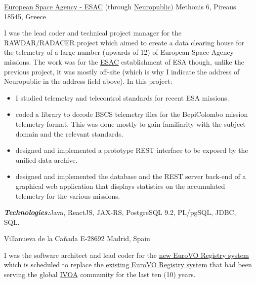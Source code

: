 \documentclass[helvetica,english,logo,notitle,totpages,utf8]{europecv2013}
\newcommand{\technologies}[0]{\textbf{\textit{Technologies:}}}
\begin{document}
\begin{europecv}
                   {\href{http://www.esac.com}{European Space Agency - ESAC} (through \href{http://www.neuropublic.gr}{Neuropublic})}
                   {Methonis 6, Pireaus 18545, Greece}
                   {
                     I was the lead coder and technical project manager for the RAWDAR/RADACER project which aimed
    to create a data clearing house for the telemetry of a large number (upwards of 12) of European Space Agency
    missions. The work was for the {\href{http://www.esac.com}{ESAC}} establishment of ESA though, unlike the previous project, it was
    mostly off-site (which is why I indicate the address of Neuropublic in the address field above). In this project:
  \begin{itemize}
    \item I studied telemetry and telecontrol standards for recent ESA missions.
    \item coded a library to decode BSCS telemetry files for the BepiColombo mission telemetry format. This was done mostly to gain
      familiarity with the subject domain and the relevant standards.
    \item designed and implemented a prototype REST interface to be exposed by the unified data archive.
    \item designed and implemented the database and the REST server back-end of a graphical web application that displays statistics
      on the accumulated telemetry for the various missions.
  \end{itemize}
  \technologies Java, ReactJS, JAX-RS, PostgreSQL 9.2, PL/pgSQL, JDBC, SQL.
                   }
                   
                                     {Villanueva de la Cañada
                                     E-28692 Madrid, Spain}
                                     {
I was the software architect and lead coder for the
    \href{registry.euro-vo.org}{new EuroVO Registry system}
    which is scheduled to replace the \href{registry.euro-vo.org}{existing EuroVO Registry system} that had been
    serving the global \href{http://www.ivoa.net/}{IVOA} community for the last ten (10) years.

}
\end{europecv}
\end{document}
